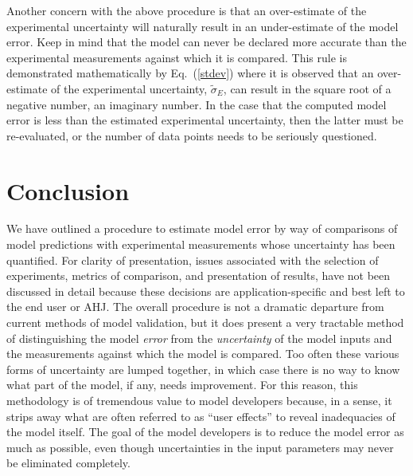 Another concern with the above procedure is that an over-estimate of the experimental uncertainty will naturally result in an under-estimate of the model error. Keep
in mind that the model can never be declared more accurate than the experimental measurements against which it is compared. This rule is demonstrated
mathematically by Eq.~(\ref{stdev}) where it is observed that an over-estimate of the experimental uncertainty, $\widetilde{\sigma}_E$, can result in
the square root of a negative number, an imaginary number. In the case that the computed model error is less than the estimated experimental uncertainty, then the
latter must be re-evaluated, or the number of data points needs to be seriously questioned.



\section{Conclusion}

We have outlined a procedure to estimate model error by way of comparisons of model predictions with experimental measurements whose uncertainty has been
quantified. For clarity of presentation, issues associated with the selection of experiments, metrics of comparison, and presentation of results, have not been
discussed in detail because these decisions are application-specific and best left to the end user or AHJ. The overall procedure is not a dramatic departure from current
methods of model validation, but it does present a very tractable method of distinguishing the model {\em error} from the {\em uncertainty} of the model inputs and the measurements
against which the model is compared. Too often these various forms of uncertainty are lumped together, in which case there is no way to know what part of the model, if
any, needs improvement. For this reason, this methodology is of tremendous value to model developers because, in a sense, it strips away what are often referred to as
``user effects'' to reveal inadequacies of the model itself. The goal of the model developers is to reduce the model error as much as possible, even though
uncertainties in the input parameters may never be eliminated completely.

